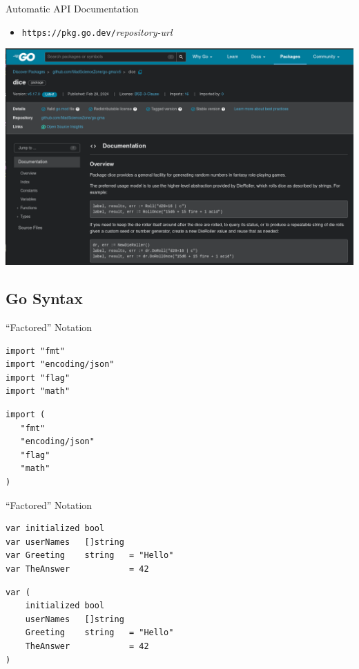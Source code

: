 \documentclass[pdf,t]{beamer}
\newcommand\z[1]{\texttt{#1}}
\begin{document}
\begin{frame}{Automatic API Documentation}
\begin{itemize}
\item\z{https://pkg.go.dev/}\emph{repository-url}
\end{itemize}
    \begin{center}
        \includegraphics[width=\textwidth]{docsite}
    \end{center}
\end{frame}

\subsection{Go Syntax}
\begin{frame}[fragile]{``Factored'' Notation}
\begin{lstlisting}
import "fmt"
import "encoding/json"
import "flag"
import "math"
\end{lstlisting}
\pause
\begin{lstlisting}
import (
   "fmt"
   "encoding/json"
   "flag"
   "math"
)
\end{lstlisting}
\end{frame}

\begin{frame}[fragile]{``Factored'' Notation}
\begin{lstlisting}
var initialized bool
var userNames   []string
var Greeting    string   = "Hello"
var TheAnswer            = 42
\end{lstlisting}
\begin{lstlisting}
var (
    initialized bool
    userNames   []string
    Greeting    string   = "Hello"
    TheAnswer            = 42
)
\end{lstlisting}
\end{frame}
\end{document}
